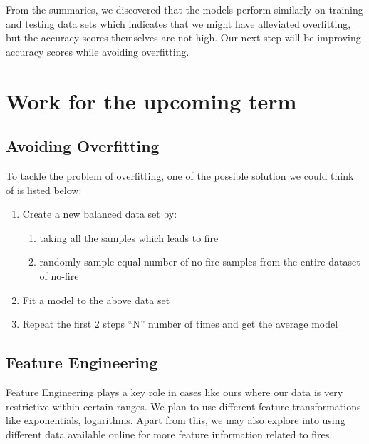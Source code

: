 \documentclass[10pt]{article}
\begin{document}



From the summaries, we discovered that the models perform similarly on training
and testing data sets which indicates that we might have alleviated
overfitting, but the accuracy scores themselves are not high. Our next step
will be improving accuracy scores while avoiding overfitting.\par

\section{Work for the upcoming term}
\subsection{Avoiding Overfitting}
To tackle the problem of overfitting, one of the possible solution we
could think of is listed below:
\begin{enumerate}
    \item
    Create a new balanced data set by:
    \begin{enumerate}
        \item
        taking all the samples which leads to fire
        \item
        randomly sample equal number of no-fire samples from the entire
        dataset of no-fire
    \end{enumerate}
    \item
    Fit a model to the above data set
    \item
    Repeat the first 2 steps ``N'' number of times and get the average model
\end{enumerate}
\subsection{Feature Engineering}
Feature Engineering plays a key role in cases like ours where our data is very
restrictive within certain ranges. We plan to use different feature
transformations like exponentials, logarithms. Apart from this, we may also
explore into using different data available online for more feature information
related to fires.\par
\end{document}
